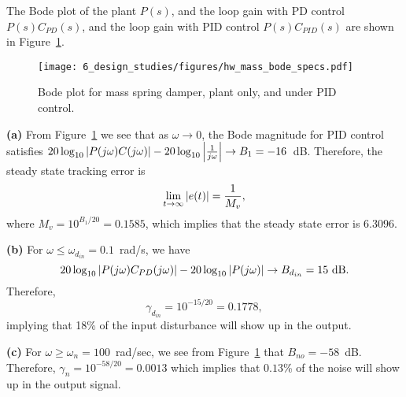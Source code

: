 The Bode plot of the plant $P(s)$, and the loop gain with PD control $P(s)C_{PD}(s)$, and the loop gain with PID control $P(s)C_{PID}(s)$ are shown in Figure~\ref{fig:hw_mass_bode_specs}.
\begin{figure}[H]
   \centering
   \texttt{[image: 6\_design\_studies/figures/hw\_mass\_bode\_specs.pdf]}
   \caption{Bode plot for mass spring damper, plant only, and under PID control.}
   \label{fig:hw_mass_bode_specs}
\end{figure}



{\bf (a)} From Figure~\ref{fig:hw_mass_bode_specs} we see that as $\omega\to 0$, the Bode magnitude for PID control satisfies $20\log_{10}\left|P(j\omega)C(j\omega)\right|-20\log_{10}\left|\frac{1}{j\omega}\right|\to B_1=-16$~dB.  
Therefore, the steady state tracking error is
\[
\lim_{t\to\infty} \left|e(t)\right| = \frac{1}{M_v},
\]
where $M_v=10^{B_1/20}=0.1585$, which implies that the steady state error is $6.3096$.

{\bf (b)} For  $\omega\leq\omega_{d_{in}} = 0.1$~rad/s, we have 
\[
20\log_{10}\left|P(j\omega)C_{PD}(j\omega)\right|-20\log_{10}\left|P(j\omega)\right|\to B_{d_{in}}=15\text{~dB}.
\]
Therefore, 
\[
\gamma_{d_{in}} = 10^{-15/20} = 0.1778,
\]
implying that 18\% of the input disturbance will show up in the output.

{\bf (c)} For $\omega\geq\omega_n=100$~rad/sec, we see from Figure~\ref{fig:hw_mass_bode_specs} that $B_{no} = -58$~dB.  Therefore, $\gamma_n = 10^{-58/20} = 0.0013$ which implies that $0.13$\% of the noise will show up in the output signal.